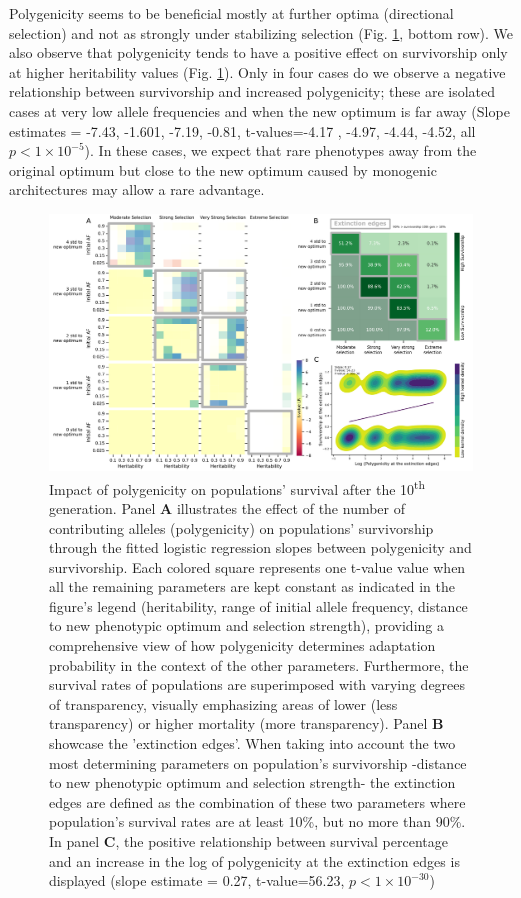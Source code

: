 \documentclass{article}
\begin{document}
Polygenicity seems to be beneficial mostly at further optima (directional selection) and not as strongly under stabilizing selection (Fig. \ref{fig:poly_panel_figure}, bottom row). We also observe that polygenicity tends to have a positive effect on survivorship only at higher heritability values (Fig. \ref{fig:poly_panel_figure}). Only in four cases do we observe a negative relationship between survivorship and increased polygenicity; these are isolated cases at very low allele frequencies and when the new optimum is far away (Slope estimates = -7.43, -1.601, -7.19, -0.81, t-values=-4.17 , -4.97, -4.44, -4.52,  all $p<1 \times 10^{-5}$). In these cases, we expect that rare phenotypes away from the original optimum but close to the new optimum caused by monogenic architectures may allow a rare advantage.

\begin{figure}[H]
    \centering
    \includegraphics[width=1\textwidth]{figures/poly_survivalship_value_edges.pdf}
    \caption{Impact of polygenicity on populations' survival after the 10\textsuperscript{th} generation. Panel \textbf{A} illustrates the effect of the number of contributing alleles (polygenicity) on populations' survivorship through the fitted logistic regression slopes between polygenicity and survivorship. Each colored square represents one t-value value when all the remaining parameters are kept constant as indicated in the figure's legend (heritability, range of initial allele frequency, distance to new phenotypic optimum and selection strength), providing a comprehensive view of how polygenicity determines adaptation probability in the context of the other parameters. Furthermore,  the survival rates of populations are superimposed with varying degrees of transparency, visually emphasizing areas of lower (less transparency) or higher mortality (more transparency). Panel \textbf{B} showcase the 'extinction edges'. When taking into account the two most determining parameters on population's survivorship -distance to new phenotypic optimum and selection strength- the extinction edges are defined as the combination of these two parameters where population's survival rates are at least 10\%, but no more than 90\%. In panel \textbf{C}, the positive relationship between survival percentage and an increase in the log of polygenicity at the extinction edges is displayed (slope estimate = 0.27, t-value=56.23,  $p<1 \times 10^{-30}$)}
    \label{fig:poly_panel_figure}
\end{figure}
\end{document}
